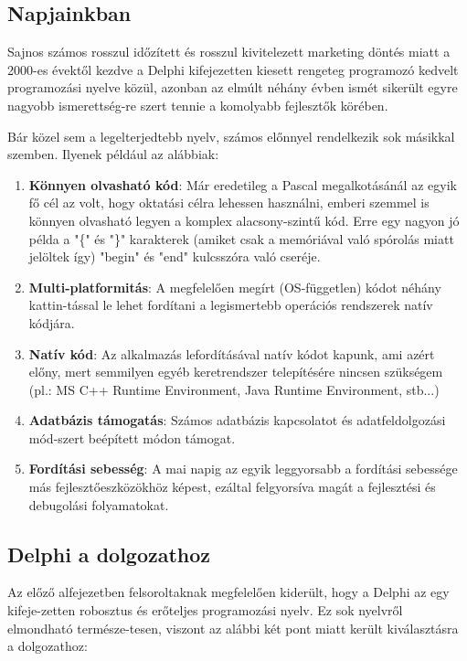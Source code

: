 \subsection{Napjainkban}

Sajnos számos rosszul időzített és rosszul kivitelezett marketing döntés miatt a 2000-es évektől kezdve a Delphi kifejezetten kiesett rengeteg programozó kedvelt programozási nyelve közül, azonban az elmúlt néhány évben ismét sikerült egyre nagyobb ismerettség\hyp{}re szert tennie a komolyabb fejlesztők körében.

Bár közel sem a legelterjedtebb nyelv, számos előnnyel rendelkezik sok másikkal szemben. Ilyenek például az alábbiak:
\begin{enumerate}
	\item \textbf{Könnyen olvasható kód}: Már eredetileg a Pascal megalkotásánál az egyik fő cél az volt, hogy oktatási célra lehessen használni, emberi szemmel is könnyen olvasható legyen a komplex alacsony-szintű kód. Erre egy nagyon jó példa a "\{" és "\}" karakterek (amiket csak a memóriával való spórolás miatt jelöltek így) "begin" és "end" kulcsszóra való cseréje.
	\item \textbf{Multi-platformitás}: A megfelelően megírt (OS-független) kódot néhány kattin\hyp{}tással le lehet fordítani a legismertebb operációs rendszerek natív kódjára.
	\item \textbf{Natív kód}: Az alkalmazás lefordításával natív kódot kapunk, ami azért előny, mert semmilyen egyéb keretrendszer telepítésére nincsen szükségem (pl.: MS C++ Runtime Environment, Java Runtime Environment, stb...)
	\item \textbf{Adatbázis támogatás}: Számos adatbázis kapcsolatot és adatfeldolgozási mód\hyp{}szert beépített módon támogat.
	\item \textbf{Fordítási sebesség}: A mai napig az egyik leggyorsabb a fordítási sebessége más fejlesztőeszközökhöz képest, ezáltal felgyorsíva magát a fejlesztési és debugolási folyamatokat.
\end{enumerate}

\subsection{Delphi a dolgozathoz}

Az előző alfejezetben felsoroltaknak megfelelően kiderült, hogy a Delphi az egy kifeje\hyp{}zetten robosztus és erőteljes programozási nyelv. Ez sok nyelvről elmondható természe\hyp{}tesen, viszont az alábbi két pont miatt került kiválasztásra a dolgozathoz:

